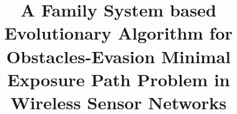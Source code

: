 \documentclass[final]{elsarticle}
\begin{document}
\begin{frontmatter}
\title{A Family System based Evolutionary Algorithm for Obstacles-Evasion Minimal Exposure Path Problem in Wireless Sensor Networks}



\end{frontmatter}
\end{document}
